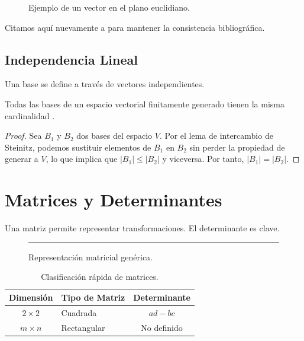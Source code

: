 	\begin{figure}[h]
		\centering
		\caption{Ejemplo de un \gls{vector} en el plano euclidiano.}
	\end{figure}
	
	Citamos aquí nuevamente a \cite{strang} para mantener la consistencia bibliográfica. 
	
	\subsection{Independencia Lineal}
	Una \gls{base} se define a través de vectores independientes. 
	
	\begin{theorem}
		Todas las bases de un espacio vectorial finitamente generado tienen la misma \gls{cardinalidad} \cite{herstein}.
	\end{theorem}
	
	\begin{proof}
		Sea $B_1$ y $B_2$ dos bases del espacio $V$. Por el lema de intercambio de Steinitz, podemos sustituir elementos de $B_1$ en $B_2$ sin perder la propiedad de generar a $V$, lo que implica que $|B_1| \leq |B_2|$ y viceversa. Por tanto, $|B_1| = |B_2|$.
	\end{proof}
	
	\section{Matrices y Determinantes}
	Una \gls{matriz} permite representar transformaciones. El \gls{determinante} es clave.
	
	\begin{figure}[h]
		\centering
		\rule{6cm}{3cm} %
		\caption{Representación matricial genérica.}
	\end{figure}
	
	\begin{table}[h]
		\centering
		\begin{tabularx}{0.6\textwidth}{ |c|X|c| }
			\hline
			\textbf{Dimensión} & \textbf{Tipo de Matriz} & \textbf{Determinante} \\
			\hline
			$2 \times 2$ & Cuadrada & $ad - bc$ \\
			$m \times n$ & Rectangular & No definido \\
			\hline
		\end{tabularx}
		\caption{Clasificación rápida de matrices.}
	\end{table}
	
